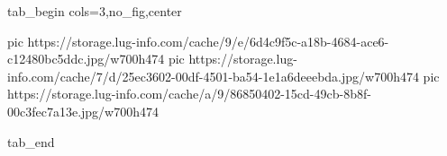  
 
 
 
 


\ifcmt
  tab_begin cols=3,no_fig,center

     pic https://storage.lug-info.com/cache/9/e/6d4c9f5c-a18b-4684-ace6-c12480bc5ddc.jpg/w700h474%
		 pic https://storage.lug-info.com/cache/7/d/25ec3602-00df-4501-ba54-1e1a6deeebda.jpg/w700h474%
		 pic https://storage.lug-info.com/cache/a/9/86850402-15cd-49cb-8b8f-00c3fec7a13e.jpg/w700h474%

  tab_end
\fi
